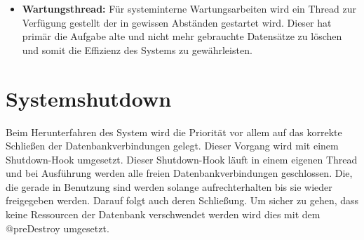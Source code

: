\begin{itemize}
			\item \textbf{Wartungsthread:}
			Für systeminterne Wartungsarbeiten wird ein Thread zur Verfügung gestellt der in gewissen Abständen gestartet wird. Dieser hat primär die Aufgabe alte und nicht mehr gebrauchte Datensätze zu löschen und somit die Effizienz des Systems zu gewährleisten.
		\end{itemize} 
	
\section{Systemshutdown}

	Beim Herunterfahren des System wird die Priorität vor allem auf das korrekte Schließen der Datenbankverbindungen gelegt. Dieser Vorgang wird mit einem Shutdown-Hook umgesetzt. Dieser Shutdown-Hook läuft in einem eigenen Thread und bei Ausführung werden alle freien Datenbankverbindungen geschlossen. Die, die gerade in Benutzung sind werden solange aufrechterhalten bis sie wieder freigegeben werden. Darauf folgt auch deren Schließung. Um sicher zu gehen, dass keine Ressourcen der Datenbank verschwendet werden wird dies mit dem @preDestroy umgesetzt. 
   